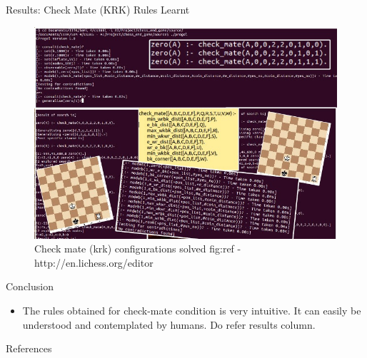\documentclass[final,hyperref={pdfpagelabels=false}]{beamer}
\begin{document}
\begin{frame}[t]
\begin{columns}[t]
\begin{column}{.465\textwidth}
\begin{block}{Results: Check Mate (KRK) Rules Learnt}
\begin{figure}
\includegraphics[width=0.8\linewidth]{1.jpg}
\caption{ Check mate (krk) configurations solved fig:ref - http://en.lichess.org/editor}
\end{figure}

\end{block}


\begin{block}{Conclusion}

\begin{itemize}
\item The rules obtained for check-mate condition is very intuitive. It can easily be understood and contemplated by humans. Do refer results column. 
\end{itemize}

\end{block}


\begin{block}{References}
        
\nocite{*} %
\small{
}

\end{block}



\end{column}
\end{columns}
\end{frame}
\end{document}
